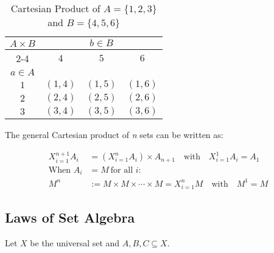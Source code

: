 \begin{table}[H]
	\centering
	\caption{Cartesian Product of \(A = \{1, 2, 3\}\) and \(B = \{4, 5, 6\}\)}
	\begin{tabular}{|c|c|c|c|}
		\hline
		\multirow{3}{*}{\(A \times B\)} & \multicolumn{3}{c|}{\(b \in B\)}                       \\
		\cline{2-4}
		                              & \(4\)                            & \(5\)      & \(6\)      \\
		\hline
		\(a \in A\)                     &                                &          &          \\
		\hline
		\(1\)                           & \((1, 4)\)                       & \((1, 5)\) & \((1, 6)\) \\
		\hline
		\(2\)                           & \((2, 4)\)                       & \((2, 5)\) & \((2, 6)\) \\
		\hline
		\(3\)                           & \((3, 4)\)                       & \((3, 5)\) & \((3, 6)\) \\
		\hline
	\end{tabular}
	\label{tab:cartesian_product}
\end{table}

The general Cartesian product of \emph{n} sets can be written as:

\begin{align*}
	X_{i = 1}^{n + 1} A_i & = \left( X_{i = 1}^{n} A_i \right) \times A_{n + 1} \quad \text{with} \quad X_{i = 1}^{1} A_i = A_1 \\
	\text{When } A_i      & = M \ \text{for all } i:                                                                            \\
	M^n                   & := M \times M \times \cdots \times M = X_{i = 1}^{n} M \quad \text{with} \quad M^1 = M
\end{align*}

\subsection{Laws of Set Algebra}

Let \(X\) be the universal set and \(A, B, C \subseteq X\).

